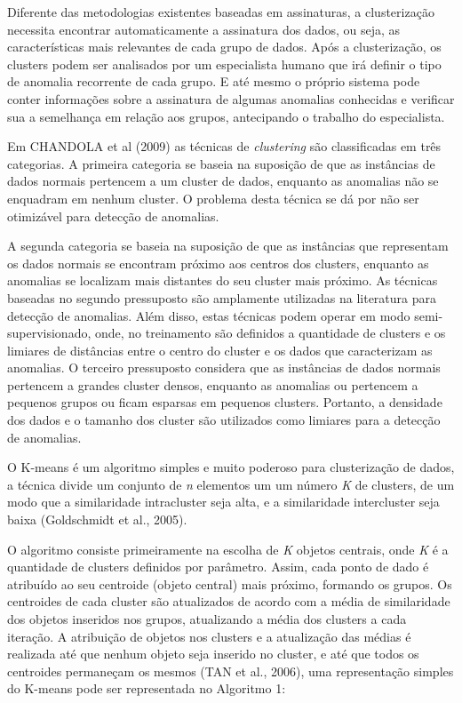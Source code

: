 \indent Diferente das metodologias existentes baseadas em assinaturas, a clusterização necessita encontrar automaticamente a assinatura dos dados, ou seja, as características mais relevantes de cada grupo de dados. Após a clusterização, os clusters podem ser analisados por um especialista humano que irá definir o tipo de anomalia recorrente de cada grupo. E até mesmo o próprio sistema pode conter informações sobre a assinatura de algumas anomalias conhecidas e verificar sua a semelhança em relação aos grupos, antecipando o trabalho do especialista.

\indent Em  CHANDOLA et al (2009) as técnicas de \textit{clustering} são classificadas em três categorias. A primeira categoria se baseia na suposição de que as instâncias de dados normais pertencem a um cluster de dados, enquanto as anomalias não se enquadram em nenhum cluster. O problema desta técnica se dá por não ser otimizável para detecção de anomalias.

\indent A segunda categoria se baseia na suposição de que as instâncias que representam os dados normais se encontram próximo aos centros dos clusters, enquanto as anomalias se localizam mais distantes do seu cluster mais próximo. As técnicas baseadas no segundo pressuposto são amplamente utilizadas na literatura para detecção de anomalias. Além disso, estas técnicas podem operar em modo semi-supervisionado, onde, no treinamento são definidos a quantidade de clusters e os limiares de distâncias entre o centro do cluster e os dados que caracterizam as anomalias. O terceiro pressuposto considera que as instâncias de dados normais pertencem a grandes cluster  densos, enquanto as anomalias ou pertencem a pequenos grupos ou ficam esparsas em pequenos clusters. Portanto, a densidade dos dados e o tamanho dos cluster são utilizados como limiares para a detecção de anomalias.

\indent O K-means é um algoritmo simples e muito poderoso para clusterização de dados, a técnica divide um conjunto de \textit{n} elementos um um número \textit{K} de clusters, de um modo que a similaridade intracluster seja alta, e a similaridade intercluster seja baixa (Goldschmidt et al., 2005).

\indent O algoritmo consiste primeiramente na escolha de \textit{K} objetos centrais, onde \textit{K} é a quantidade de clusters definidos por parâmetro. Assim, cada ponto de dado é atribuído ao seu centroide (objeto central) mais próximo, formando os grupos. Os centroides de cada cluster são atualizados de acordo com a média de similaridade dos objetos inseridos nos grupos, atualizando a média dos clusters a cada iteração. A atribuição de objetos nos clusters e a atualização das médias é realizada até que nenhum objeto seja inserido no cluster, e até que todos os centroides permaneçam os mesmos (TAN et al., 2006), uma representação simples do K-means pode ser representada no Algoritmo 1:

